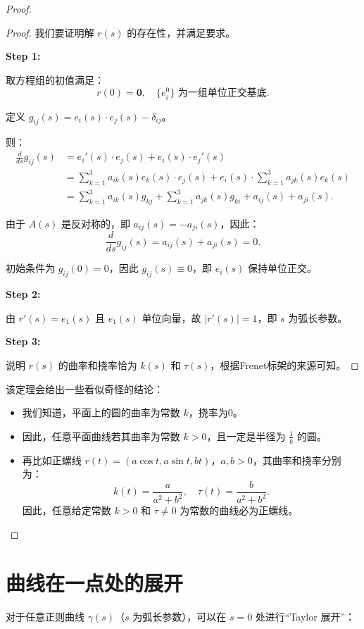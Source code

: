 \documentclass[lang=cn,10pt,thmcnt=section]{elegantbook}
\renewcommand{\vec}[1]{\mathbf{#1}}
\begin{document}
\begin{proof}
\begin{proof}
    我们要证明解 $r(s)$ 的存在性，并满足要求。
    
    \textbf{Step 1:}
    
    取方程组的初值满足：
    \[
    r(0) = \vec{0}, \quad \{e_i^0\} \text{ 为一组单位正交基底}.
    \]
    
    定义 \(g_{ij}(s) = e_i(s) \cdot e_j(s) - \delta_{ij}\)。
    
    则：
    \begin{align*}
    \frac{d}{ds} g_{ij}(s) &= e_i'(s) \cdot e_j(s) + e_i(s) \cdot e_j'(s) \\
    &= \sum_{k=1}^3 a_{ik}(s) e_k(s) \cdot e_j(s) + e_i(s) \cdot \sum_{k=1}^3 a_{jk}(s) e_k(s) \\
    &= \sum_{k=1}^3 a_{ik}(s) g_{kj} + \sum_{k=1}^3 a_{jk}(s) g_{ki} + a_{ij}(s) + a_{ji}(s).
    \end{align*}
    
    由于 \(A(s)\) 是反对称的，即 \(a_{ij}(s) = -a_{ji}(s)\)，因此：
    \[
    \frac{d}{ds} g_{ij}(s) = a_{ij}(s) + a_{ji}(s) = 0.
    \]
    
    初始条件为 \(g_{ij}(0) = 0\)，因此 \(g_{ij}(s) \equiv 0\)，即 \(e_i(s)\) 保持单位正交。
    
    \textbf{Step 2:}
    
    由 \(r'(s) = e_1(s)\) 且 \(e_1(s)\) 单位向量，故 \(|r'(s)| = 1\)，即 \(s\) 为弧长参数。
    
    \textbf{Step 3:}
    
    说明 \(r(s)\) 的曲率和挠率恰为 \(k(s)\) 和 \(\tau(s)\)，根据Frenet标架的来源可知。
    \end{proof}
    
    \begin{corollary}
    该定理会给出一些看似奇怪的结论：
    \begin{itemize}
        \item 我们知道，平面上的圆的曲率为常数 \(k\)，挠率为0。
        \item 因此，任意平面曲线若其曲率为常数 \(k > 0\)，且一定是半径为 \(\frac{1}{k}\) 的圆。
        \item 再比如正螺线 \(r(t) = (a \cos t, a \sin t, bt)\)，\(a, b > 0\)，其曲率和挠率分别为：
        \[
        k(t) = \frac{a}{a^2 + b^2}, \quad \tau(t) = \frac{b}{a^2 + b^2}.
        \]
        因此，任意给定常数 \(k > 0\) 和 \(\tau \neq 0\) 为常数的曲线必为正螺线。
    \end{itemize}
    \end{corollary}
\end{proof}
\section{曲线在一点处的展开}
对于任意正则曲线 \(\gamma(s)\)（\(s\) 为弧长参数），可以在 \(s=0\) 处进行“Taylor 展开”：
\end{document}
